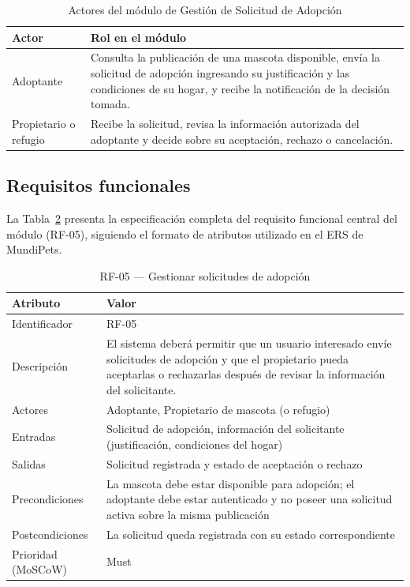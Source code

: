 \documentclass[journal,onecolumn]{IEEEtran}
\begin{document}
\begin{table}[h!]
	\centering
	\caption{Actores del módulo de Gestión de Solicitud de Adopción}
	\label{tab:actores-modulo}
	\begin{tabular}{|p{3cm}|p{10cm}|}
		\hline
		\textbf{Actor} & \textbf{Rol en el módulo} \\
		\hline
		Adoptante & Consulta la publicación de una mascota disponible, envía la solicitud de adopción ingresando su justificación y las condiciones de su hogar, y recibe la notificación de la decisión tomada. \\
		\hline
		Propietario o refugio & Recibe la solicitud, revisa la información autorizada del adoptante y decide sobre su aceptación, rechazo o cancelación. \\
		\hline
	\end{tabular}
\end{table}

\subsection{Requisitos funcionales}

La Tabla~\ref{tab:rf05} presenta la especificación completa del requisito funcional central del módulo (RF-05), siguiendo el formato de atributos utilizado en el ERS de MundiPets.

\begin{table}[h!]
	\centering
	\caption{RF-05 --- Gestionar solicitudes de adopción}
	\label{tab:rf05}
	\begin{tabular}{|p{3.5cm}|p{9.5cm}|}
		\hline
		\textbf{Atributo} & \textbf{Valor} \\
		\hline
		Identificador & RF-05 \\
		\hline
		Descripción & El sistema deberá permitir que un usuario interesado envíe solicitudes de adopción y que el propietario pueda aceptarlas o rechazarlas después de revisar la información del solicitante. \\
		\hline
		Actores & Adoptante, Propietario de mascota (o refugio) \\
		\hline
		Entradas & Solicitud de adopción, información del solicitante (justificación, condiciones del hogar) \\
		\hline
		Salidas & Solicitud registrada y estado de aceptación o rechazo \\
		\hline
		Precondiciones & La mascota debe estar disponible para adopción; el adoptante debe estar autenticado y no poseer una solicitud activa sobre la misma publicación \\
		\hline
		Postcondiciones & La solicitud queda registrada con su estado correspondiente \\
		\hline
		Prioridad (MoSCoW) & Must \\
		\hline
	\end{tabular}
\end{table}
\end{document}
